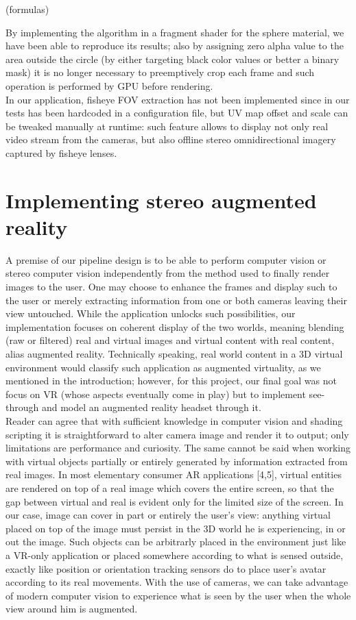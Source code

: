 (formulas)

By implementing the algorithm in a fragment shader for the sphere material, we have been able to reproduce its results; also by assigning zero alpha value to the area outside the circle (by either targeting black color values or better a binary mask) it is no longer necessary to preemptively crop each frame and such operation is performed by GPU before rendering.\\
In our application, fisheye FOV extraction has not been implemented since in our tests has been hardcoded in a configuration file, but UV map offset and scale can be tweaked manually at runtime: such feature allows to display not only real video stream from the cameras, but also offline stereo omnidirectional imagery captured by fisheye lenses.

\section{Implementing stereo augmented reality}
A premise of our pipeline design is to be able to perform computer vision or stereo computer vision independently from the method used to finally render images to the user. One may choose to enhance the frames and display such to the user or merely extracting information from one or both cameras leaving their view untouched. While the application unlocks such possibilities, our implementation focuses on coherent display of the two worlds, meaning blending (raw or filtered) real and virtual images and virtual content with real content, alias augmented reality. Technically speaking, real world content in a 3D virtual environment would classify such application as augmented virtuality, as we mentioned in the introduction; however, for this project, our final goal was not focus on VR (whose aspects eventually come in play) but to implement see-through and model an augmented reality headset through it.\\
Reader can agree that with sufficient knowledge in computer vision and shading scripting it is straightforward to alter camera image and render it to output; only limitations are performance and curiosity. The same cannot be said when working with virtual objects partially or entirely generated by information extracted from real images. In most elementary consumer AR applications [4,5], virtual entities are rendered on top of a real image which covers the entire screen, so that the gap between virtual and real is evident only for the limited size of the screen. In our case, image can cover in part or entirely the user’s view: anything virtual placed on top of the image must persist in the 3D world he is experiencing, in or out the image. Such objects can be arbitrarly placed in the environment just like a VR-only application or placed somewhere according to what is sensed outside, exactly like position or orientation tracking sensors do to place user’s avatar according to its real movements. With the use of cameras, we can take advantage of modern computer vision to experience what is seen by the user when the whole view around him is augmented.\\
